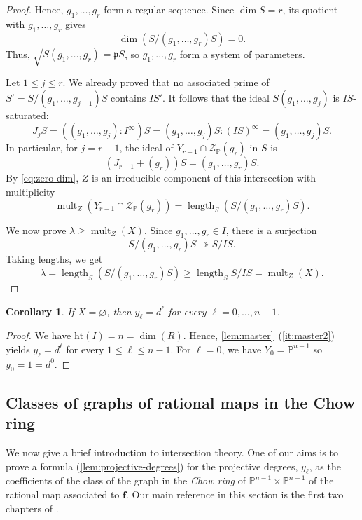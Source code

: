 \documentclass[11pt,letterpaper]{article}
\newtheorem{corollary}[theorem]{Corollary}\AddToHook{env/corollary/begin}{\crefalias{theorem}{corollary}}
\numberwithin{equation}{section}
\newcommand{\PP}{\mathbb{P}}
\newcommand{\cZ}{\mathcal{Z}}
\newcommand{\ff}{\ensuremath{\boldsymbol{f}}}
\newcommand{\fp}{\mathfrak{p}}
\DeclareMathOperator{\length}{length}
\DeclareMathOperator{\mult}{mult}
\begin{document}
\begin{proof}
Hence, $g_1,\dots,g_r$ form a regular sequence.
    Since $\dim S = r$, its quotient with $g_1,\dots,g_r$ gives \begin{equation}
   \label{eq:zero-dim}
    \dim(S/ (g_1,\dots,g_r)S)=0.
        \end{equation} Thus, $\sqrt{S(g_1,\dots,g_r)}=\fp S$, so $g_1,\dots,g_r$ form a system of parameters.

Let $1\leq j\leq r$.
We already proved that no associated prime of $S'=S/(g_1,\dots,g_{j-1})S$ contains $IS'$.
It follows that the ideal $S(g_1,\dots,g_j)$ is $IS$-saturated: \[
J_j S = ((g_1,\dots,g_j) : I^{\infty}) S = (g_1,\dots,g_j) S :(IS)^{\infty} = (g_1,\dots,g_j) S.
\]
In particular, for $j=r-1$, the ideal of $Y_{r-1}\cap\cZ_{\PP}(g_r)$ in $S$ is \[
(J_{r-1}+(g_r))S = (g_1,\dots,g_r)S.
\]
By \cref{eq:zero-dim}, $Z$ is an irreducible component of this intersection with multiplicity \[
\mult_Z( Y_{r-1}\cap\cZ_{\PP}(g_r) ) = \length_{S}(S/(g_1,\dots,g_r)S).
\]

We now prove $\lambda\geq \mult_Z(X)$.
    Since $g_1,\dots,g_r\in I$, there is a surjection \[
    S/(g_1,\dots,g_r)S \twoheadrightarrow S/IS.
    \] Taking lengths, we get \[
    \lambda = \length_{S}(S/(g_1,\dots,g_r)S) \geq \length_S S/IS = \mult_Z(X).
    \]
\end{proof}

\begin{corollary}
\label{lem:regular-degrees}
If $X=\varnothing$, then $y_\ell=d^{\ell}$ for every $\ell=0,\dots,n-1$.
\end{corollary}
\begin{proof}
We have $\mathrm{ht}(I)=n=\dim(R)$. 
Hence, \cref{lem:master}~(\ref{it:master2}) yields $y_\ell=d^\ell$ for every $1\leq \ell\leq n-1$.
For $\ell=0$, we have $Y_0=\PP^{n-1}$ so $y_0=1=d^{0}$.
\end{proof}

\subsection{Classes of graphs of rational maps in the Chow ring}

We now give a brief introduction to intersection theory. 
One of our aims is to prove a formula (\cref{lem:projective-degrees}) for the projective degrees, $y_\ell$, as the coefficients of the class of the graph in the \emph{Chow ring} of $\PP^{n-1}\times\PP^{n-1}$ of the rational map associated to $\ff$.
Our main reference in this section is the first two chapters of \cite{Eisenbud-Harris-16}.
\end{document}
